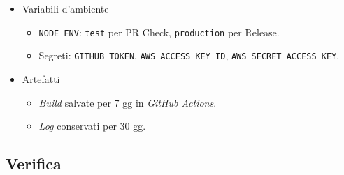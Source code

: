 \documentclass[12pt, a4paper]{article}
\begin{document}
\begin{itemize}
\begin{enumerate}
\begin{itemize}
            \item Artefatti: salvati in \texttt{/dist}.
        \end{itemize}
        \item Release Production (\texttt{release.yml})
        \begin{itemize}
            \item Trigger: \textit{push tag} \texttt{v*} su \texttt{main}.
            \item Fasi:\\[10pt]
                  1-11. come \textit{Pull Request Check}.
            \begin{enumerate}[label=\arabic*., start=12]
                \item Configurazione delle credenziali \textit{AWS}.
                \item \textit{Deploy} \textit{frontend} su \textit{Amazon S3}.
                \item Login \textit{Amazon ECR}.
                \item \textit{Build}, \textit{tag}, \textit{push} delle immagini \textit{Docker}.
                \item \textit{Deploy} su \textit{Amazon ECS}.
            \end{enumerate}
            \item Artefatti: build e tag di rilascio.
        \end{itemize}
    \end{enumerate}
    \item Variabili d'ambiente
    \begin{itemize}
        \item \texttt{NODE\_ENV}: \texttt{test} per PR Check, \texttt{production} per Release.
        \item Segreti: \texttt{GITHUB\_TOKEN}, \texttt{AWS\_ACCESS\_KEY\_ID}, \texttt{AWS\_SECRET\_ACCESS\_KEY}.
    \end{itemize}
    \item Artefatti
    \begin{itemize}
        \item \textit{Build} salvate per 7 gg in \textit{GitHub Actions}.
        \item \textit{Log} conservati per 30 gg.
    \end{itemize}
\end{itemize}

\newpage

\subsection{Verifica}
\end{document}
